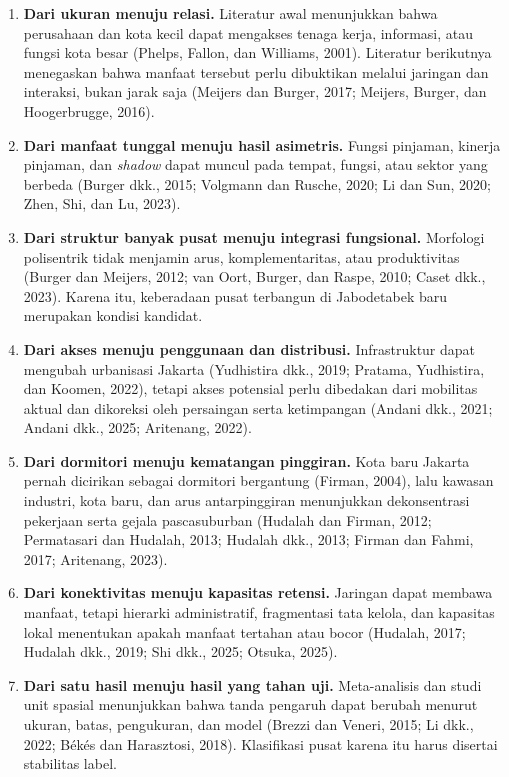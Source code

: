 \documentclass[
  indonesian,
  11pt,
  a4paper,
  oneside,
  openany]{report}
\providecommand{\tightlist}{%
  \setlength{\itemsep}{0pt}\setlength{\parskip}{0pt}}
\begin{document}
\begin{enumerate}
\def\labelenumi{\arabic{enumi}.}
\tightlist
\item
  \textbf{Dari ukuran menuju relasi.} Literatur awal menunjukkan bahwa
  perusahaan dan kota kecil dapat mengakses tenaga kerja, informasi,
  atau fungsi kota besar (Phelps, Fallon, dan Williams, 2001). Literatur
  berikutnya menegaskan bahwa manfaat tersebut perlu dibuktikan melalui
  jaringan dan interaksi, bukan jarak saja (Meijers dan Burger, 2017;
  Meijers, Burger, dan Hoogerbrugge, 2016).
\item
  \textbf{Dari manfaat tunggal menuju hasil asimetris.} Fungsi pinjaman,
  kinerja pinjaman, dan \emph{shadow} dapat muncul pada tempat, fungsi,
  atau sektor yang berbeda (Burger dkk., 2015; Volgmann dan Rusche,
  2020; Li dan Sun, 2020; Zhen, Shi, dan Lu, 2023).
\item
  \textbf{Dari struktur banyak pusat menuju integrasi fungsional.}
  Morfologi polisentrik tidak menjamin arus, komplementaritas, atau
  produktivitas (Burger dan Meijers, 2012; van Oort, Burger, dan Raspe,
  2010; Caset dkk., 2023). Karena itu, keberadaan pusat terbangun di
  Jabodetabek baru merupakan kondisi kandidat.
\item
  \textbf{Dari akses menuju penggunaan dan distribusi.} Infrastruktur
  dapat mengubah urbanisasi Jakarta (Yudhistira dkk., 2019; Pratama,
  Yudhistira, dan Koomen, 2022), tetapi akses potensial perlu dibedakan
  dari mobilitas aktual dan dikoreksi oleh persaingan serta ketimpangan
  (Andani dkk., 2021; Andani dkk., 2025; Aritenang, 2022).
\item
  \textbf{Dari dormitori menuju kematangan pinggiran.} Kota baru Jakarta
  pernah dicirikan sebagai dormitori bergantung (Firman, 2004), lalu
  kawasan industri, kota baru, dan arus antarpinggiran menunjukkan
  dekonsentrasi pekerjaan serta gejala pascasuburban (Hudalah dan
  Firman, 2012; Permatasari dan Hudalah, 2013; Hudalah dkk., 2013;
  Firman dan Fahmi, 2017; Aritenang, 2023).
\item
  \textbf{Dari konektivitas menuju kapasitas retensi.} Jaringan dapat
  membawa manfaat, tetapi hierarki administratif, fragmentasi tata
  kelola, dan kapasitas lokal menentukan apakah manfaat tertahan atau
  bocor (Hudalah, 2017; Hudalah dkk., 2019; Shi dkk., 2025; Otsuka,
  2025).
\item
  \textbf{Dari satu hasil menuju hasil yang tahan uji.} Meta-analisis
  dan studi unit spasial menunjukkan bahwa tanda pengaruh dapat berubah
  menurut ukuran, batas, pengukuran, dan model (Brezzi dan Veneri, 2015;
  Li dkk., 2022; Békés dan Harasztosi, 2018). Klasifikasi pusat karena
  itu harus disertai stabilitas label.
\end{enumerate}
\end{document}

